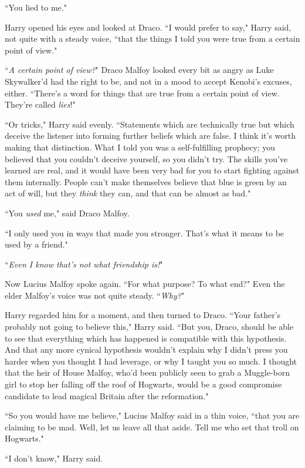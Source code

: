 ``You lied to me."

Harry opened his eyes and looked at Draco. ``I would prefer to say," Harry said, not quite with a steady voice, ``that the things I told you were true from a certain point of view."

``\emph{A certain point of view?}" Draco Malfoy looked every bit as angry as Luke Skywalker'd had the right to be, and not in a mood to accept Kenobi's excuses, either. ``There's a word for things that are true from a certain point of view. They're called \emph{lies}!"

``Or tricks," Harry said evenly. ``Statements which are technically true but which deceive the listener into forming further beliefs which are false. I think it's worth making that distinction. What I told you was a self-fulfilling prophecy; you believed that you couldn't deceive yourself, so you didn't try. The skills you've learned are real, and it would have been very bad for you to start fighting against them internally. People can't make themselves believe that blue is green by an act of will, but they \emph{think} they can, and that can be almost as bad."

``You \emph{used} me," said Draco Malfoy.

``I only used you in ways that made you stronger. That's what it means to be used by a friend."

``\emph{Even I know that's not what friendship is!}"

Now Lucius Malfoy spoke again. ``For what purpose? To what end?" Even the elder Malfoy's voice was not quite steady. ``\emph{Why?}"

Harry regarded him for a moment, and then turned to Draco. ``Your father's probably not going to believe this," Harry said. ``But you, Draco, should be able to see that everything which has happened is compatible with this hypothesis. And that any more cynical hypothesis wouldn't explain why I didn't press you harder when you thought I had leverage, or why I taught you so much. I thought that the heir of House Malfoy, who'd been publicly seen to grab a Muggle-born girl to stop her falling off the roof of Hogwarts, would be a good compromise candidate to lead magical Britain after the reformation."

``So you would have me believe," Lucius Malfoy said in a thin voice, ``that you are claiming to be mad. Well, let us leave all that aside. Tell me who set that troll on Hogwarts."

``I don't know," Harry said.

